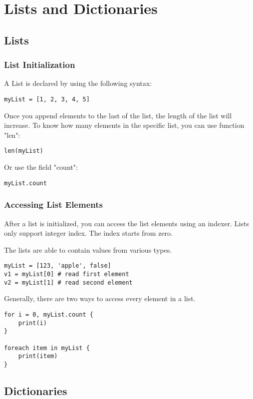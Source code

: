 \chapter{Lists and Dictionaries}
\section{Lists}
\subsection{List Initialization}
A List is declared by using the following syntax:

\begin{lstlisting}
myList = [1, 2, 3, 4, 5]
\end{lstlisting}

Once you append elements to the last of the list, the length of the list will increase. To know how many elements in the specific list, you can use function "len":

\begin{lstlisting}
len(myList)
\end{lstlisting}

Or use the field "count":

\begin{lstlisting}
myList.count
\end{lstlisting}

\subsection{Accessing List Elements}
After a list is initialized, you can access the list elements using an indexer. Lists only support integer index. The index starts from zero.

The lists are able to contain values from various types.

\begin{lstlisting}
myList = [123, 'apple', false]
v1 = myList[0] # read first element
v2 = myList[1] # read second element
\end{lstlisting}

Generally, there are two ways to access every element in a list.

\begin{lstlisting}
for i = 0, myList.count {
	print(i)
}

foreach item in myList {
	print(item)
}
\end{lstlisting}

\section{Dictionaries}
